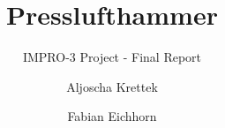 \documentclass[%
   final,      %
   paper=a4,%
   paper=portrait, %
   pagesize=auto, %
   fontsize=12pt,%
   version=last, %
]{scrartcl} %
\begin{document}
\title{Presslufthammer}
\subtitle{IMPRO-3 Project - Final Report}
\author{Aljoscha Krettek \and Fabian Eichhorn}
\maketitle
\tableofcontents





\clearpage
\listoffigures
\listoftables
\renewcommand{\lstlistlistingname}{List of Listings}
\lstlistoflistings

\appendix


\end{document}
